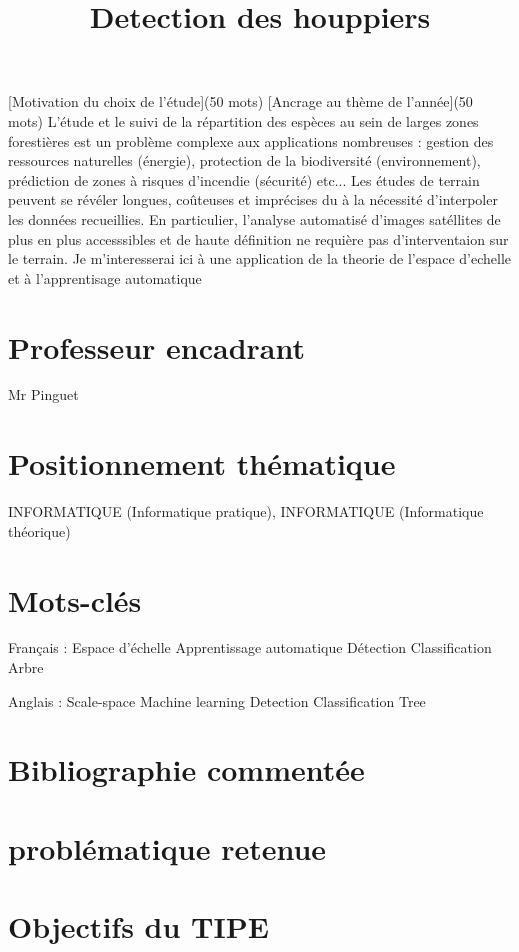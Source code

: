 \documentclass{article}
\title{Detection des houppiers}
\begin{document}
\maketitle

[Motivation du choix de l'étude](50 mots)
[Ancrage au thème de l'année](50 mots) 
L'étude et le suivi de la répartition des espèces au sein de larges zones forestières est un problème complexe aux applications nombreuses :
gestion des ressources naturelles (énergie), protection de la biodiversité (environnement), prédiction de zones à risques d'incendie (sécurité) etc... Les études de terrain peuvent se révéler longues, coûteuses et imprécises du à la nécessité d'interpoler les données recueillies. 
En particulier, l'analyse automatisé d'images satéllites de plus en plus accesssibles et de haute définition ne requière pas d'interventaion sur le terrain. 
Je m'interesserai ici à une application de la theorie de l'espace d'echelle et à l'apprentisage automatique  

\section{Professeur encadrant}
Mr Pinguet

\section{Positionnement thématique}
INFORMATIQUE (Informatique pratique), INFORMATIQUE (Informatique théorique)

\section{Mots-clés}
Français :
Espace d'échelle
Apprentissage automatique 
Détection
Classification 
Arbre

Anglais :
Scale-space
Machine learning
Detection
Classification
Tree

\section{Bibliographie commentée}

\section{problématique retenue}

\section{Objectifs du TIPE}
\end{document}
